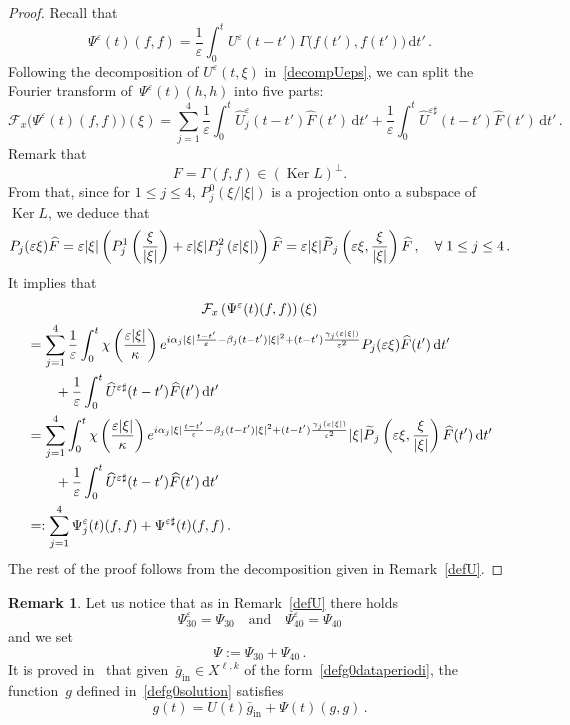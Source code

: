 \documentclass[11pt]{article}
\theoremstyle{definition}
\newtheorem{rema}[theo]{Remark}
\numberwithin{equation}{section}
\numberwithin{figure}{section}
\numberwithin{table}{section}
\newcommand*{\dd}{\mathrm{d}}
\newcommand*{\dt}{\dd t}
\newcommand*\eps{{\varepsilon}}
\newcommand*\e{{\varepsilon}}
\DeclareMathOperator{\inn}{in}
\let\oldforall\forall
\renewcommand*{\forall}{\mathrel{\oldforall}}
\let\oldtilde\tilde
\renewcommand*{\tilde}[1]{\mathchoice{\widetilde{#1}}{\widetilde{#1}}{\oldtilde{#1}}{\oldtilde{#1}}}
\begin{document}
\begin{proof}
Recall that
\[
\Psi^\e(t) (f,f) =\frac1\e \int_0^t U^\e (t-t') \Gamma \big(f(t'),f(t')\big) \, \dt' \,.
\]
Following the decomposition of $ U^\e(t,\xi)$ in~\eqref{decompUeps}, we can split the Fourier transform of~$\Psi^\eps(t)(h,h)$ into five parts:
\[
\mathcal{F}_x\big({\Psi^\e(t) (f,f)}\big)(\xi) = \sum_{j=1}^4 \frac{1}{\eps} \int_0^t \widehat U^\eps_j(t-t') \widehat F(t') \, \dt' +\frac{1}{\eps} \int_0^t \widehat U^{\eps\sharp}(t- t') \widehat F(t') \, \dt'\,.
\]
Remark that
\[
F=\Gamma(f,f) \in (\operatorname{Ker} L)^\perp.
\]
From that, since for $1 \le j \le 4$, $P_j^0(\xi/|\xi|)$ is a projection onto a subspace of $\operatorname{Ker} L$, we deduce that
\[
P_j(\e \xi) \widehat F = \e |\xi| \left(P_j^1 \left(\frac{\xi}{|\xi|}\right) + \e |\xi| P_j^2 \left(\e|\xi|\right)\right)\widehat F =\e |\xi| \tilde P_j\left(\eps \xi, \frac{\xi}{|\xi|}\right) \widehat F\,, \quad \forall 1 \le j \le 4 \,.
\]
It implies that
\begin{multline*}
\mathcal{F}_x\left({\Psi^\e(t) (f,f)}\right)(\xi) \\
\begin{aligned}
& = \sum_{j=1}^4 \frac{1}{\eps} \int_0^t \chi\left(\frac{\eps |\xi|} \kappa\right)e^{i\alpha_j|\xi|\frac{{t-t'}}{\eps}-\beta_j(t-t')|\xi|^2+(t-t')\frac{\gamma_j(\eps|\xi|)}{\eps^2}} P_j(\eps \xi) \widehat F(t') \, \dt' \\
&\qquad +\frac{1}{\eps} \int_0^t \widehat U^{\eps\sharp}(t-t') \widehat F(t') \, \dt' \\
& = \sum_{j=1}^4 \int_0^t \chi\left(\frac{\eps |\xi|} \kappa\right)e^{i\alpha_j|\xi|\frac{{t-t'}}{\eps}-\beta_j(t-t')|\xi|^2+(t-t')\frac{\gamma_j(\eps|\xi|)}{\eps^2}} |\xi| \tilde P_j\left(\eps \xi, \frac{\xi}{|\xi|}\right) \widehat F(t') \, \dt' \\
&\qquad +\frac{1}{\eps} \int_0^t \widehat U^{\eps\sharp}(t-t') \widehat F(t') \, \dt' \\
& =: \sum_{j=1}^4\Psi^\eps_j(t)(f,f) + \Psi^{\eps \sharp}(t)(f,f) \,.
\end{aligned}
\end{multline*}
The rest of the proof follows from the decomposition given in Remark~\ref{defU}.
\end{proof}

\begin{rema}\label{defPsi}
Let us notice that as in Remark~\ref{defU} there holds
\[
\Psi^\eps_{30} = \Psi_{30} \quad \text{and}\quad \Psi^\eps_{40} = \Psi_{40}
\]
and we set
\[
\Psi := \Psi_{30}+ \Psi_{40} \,.
\]
It is proved in~\cite{Bardos-Ukai} that given~$\bar g_{\inn} \in X^{{\ell},k}$ of the form~\eqref{defg0dataperiodi}, the function~$g$ defined in~\eqref{defg0solution} satisfies
\[
g(t) =U (t) \bar g_{\inn} + \Psi(t) (g,g) \,.
\]
\end{rema}
\end{document}
